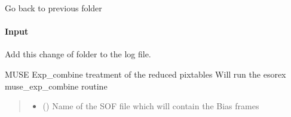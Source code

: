 \documentclass[letterpaper,10pt,english]{sphinxmanual}
\begin{document}
\begin{fulllineitems}
\begin{fulllineitems}
\end{fulllineitems}


\begin{fulllineitems}
\label{\detokenize{api/pymusepipe:pymusepipe.combine.MusePointings.goto_prevfolder}}
\pysigstartsignatures
{}
\pysigstopsignatures
\sphinxAtStartPar
Go back to previous folder


\paragraph{Input}
\label{\detokenize{api/pymusepipe:id49}}\begin{description}
\sphinxAtStartPar
Add this change of folder to the log file.

\end{description}

\end{fulllineitems}


\begin{fulllineitems}
\label{\detokenize{api/pymusepipe:pymusepipe.combine.MusePointings.run_combine}}
\pysigstartsignatures
{}
\pysigstopsignatures
\sphinxAtStartPar
MUSE Exp\_combine treatment of the reduced pixtables
Will run the esorex muse\_exp\_combine routine
\begin{quote}\begin{description}
\begin{itemize}
\item {} 
\sphinxAtStartPar
{} (\sphinxstyleliteralemphasis{\sphinxupquote{ (}}\sphinxstyleliteralemphasis{\sphinxupquote{)}}) \textendash{} Name of the SOF file which will contain the Bias frames


\end{itemize}
\end{description}
\end{quote}
\end{fulllineitems}
\end{fulllineitems}
\end{document}
